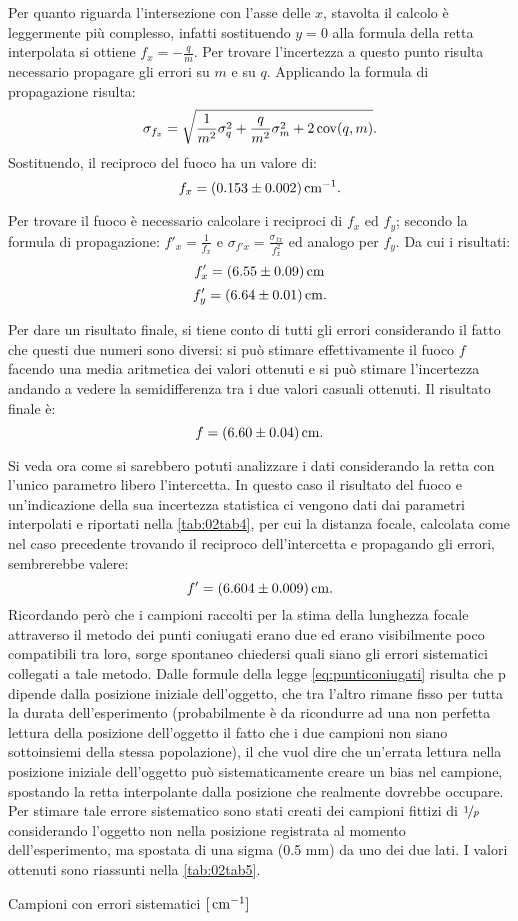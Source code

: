 Per quanto riguarda l'intersezione con l'asse delle $x$, stavolta il calcolo è leggermente più complesso, infatti sostituendo $y = 0$
 alla formula della retta interpolata si ottiene $f_x = -\frac{q}{m}$.  Per trovare l'incertezza a questo punto risulta necessario
 propagare gli errori su $m$ e su $q$. Applicando la formula di propagazione risulta:
\[\sigma_{f_x} = \sqrt {\frac{1} {m^2} \sigma_q^2 + \frac{q}{m^2} \sigma_m^2 + 2 \operatorname{cov} (q,m) }.\] 
 Sostituendo, il reciproco del fuoco ha un valore di:
\[f_x = (0.153 \pm 0.002) \,\mathrm{cm}^{-1}.\]

Per trovare il fuoco è necessario calcolare i reciproci di $f_x$ ed $f_y$; secondo la formula di 
propagazione: $f'_x = \frac{1}{f_x}$ e $\sigma_{f'x} = \frac{\sigma_{fx}}{f_{x}^2}$ ed analogo per $f_y$. Da cui i risultati:
\[f'_x = (6.55 \pm 0.09) \,\mathrm{cm} \]
\[f'_y = (6.64 \pm 0.01) \,\mathrm{cm} .\]

Per dare un risultato finale, si tiene conto di tutti gli errori considerando il fatto che questi due numeri sono diversi: si può 
 stimare effettivamente il fuoco $f$ facendo una media aritmetica dei valori ottenuti e si può stimare l'incertezza
 andando a vedere la
 semidifferenza tra i due valori casuali ottenuti. Il risultato finale è:
\[f = (6.60 \pm 0.04) \,\mathrm{cm} .\]

Si veda ora come si sarebbero potuti analizzare i dati considerando la retta con l'unico parametro libero l'intercetta. In questo
 caso il risultato del fuoco e un'indicazione della sua incertezza statistica ci vengono dati dai parametri interpolati e
 riportati nella \autoref{tab:02tab4}, per cui la distanza focale, calcolata come nel caso precedente trovando il reciproco
 dell'intercetta e propagando gli errori, sembrerebbe valere:
\[f' = (6.604 \pm 0.009) \,\mathrm{cm} .\]
Ricordando però che i campioni raccolti per la stima della lunghezza focale attraverso il metodo dei punti coniugati erano due ed
 erano visibilmente poco compatibili tra loro, sorge spontaneo chiedersi quali siano gli errori sistematici collegati a tale metodo.
 Dalle formule della legge \eqref{eq:punticoniugati} risulta che p dipende dalla posizione iniziale dell'oggetto, che tra
 l'altro rimane fisso per tutta la durata dell'esperimento (probabilmente è da ricondurre ad una non perfetta lettura della posizione
 dell'oggetto il fatto che i due campioni non siano sottoinsiemi della stessa popolazione), il che vuol dire che un'errata lettura
 nella posizione iniziale dell'oggetto può sistematicamente creare un bias nel campione, spostando la retta interpolante dalla
 posizione che realmente dovrebbe occupare. Per stimare tale errore sistematico sono stati creati dei campioni fittizi di $\nicefrac{1}{p}$
 considerando l'oggetto non nella posizione registrata al momento dell'esperimento, ma spostata di una sigma (0.5 mm) da
 uno dei due lati. I valori ottenuti sono riassunti nella \autoref{tab:02tab5}.
\begin{tabella}
	\centering
	
	\caption{Campioni con errori sistematici $[\,\mathrm{cm}^{-1}]$}
	\label{tab:02tab5}
\end{tabella}

